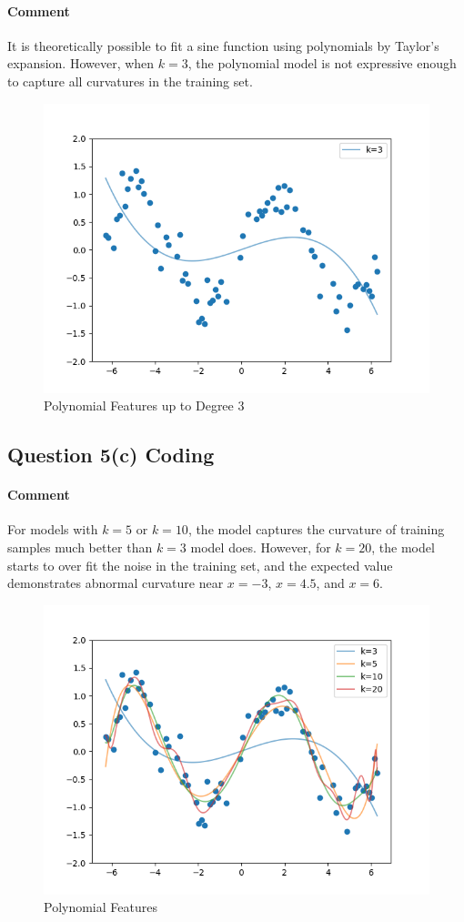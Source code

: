 \documentclass[11pt]{article}
\begin{document}
	\paragraph{Comment} It is theoretically possible to fit a sine function using polynomials by Taylor's expansion. However, when $k=3$, the polynomial model is not expressive enough to capture all curvatures in the training set.
	\begin{figure}[h]
		\centering
		\includegraphics[width=0.6\linewidth]{src/featuremaps/5b.png}
		\caption{Polynomial Features up to Degree 3}
	\end{figure}
	
	\newpage
	\subsection{Question 5(c) Coding}
	\paragraph{Comment} For models with $k=5$ or $k=10$, the model captures the curvature of training samples much better than $k=3$ model does. However, for $k=20$, the model starts to over fit the noise in the training set, and the expected value demonstrates abnormal curvature near $x=-3$, $x=4.5$, and $x=6$.
	\begin{figure}[h]
		\centering
		\includegraphics[width=0.6\linewidth]{src/featuremaps/5c.png}
		\caption{Polynomial Features}
	\end{figure}
	
\end{document}
